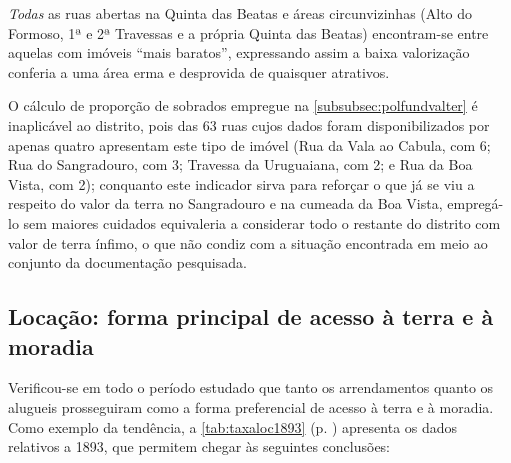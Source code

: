 \textit{Todas} as ruas abertas na Quinta das Beatas e áreas circunvizinhas (Alto do Formoso, 1ª e 2ª Travessas e a própria Quinta das Beatas) encontram-se entre aquelas com imóveis ``mais baratos'', expressando assim a baixa valorização conferia a uma área erma e desprovida de quaisquer atrativos.

O cálculo de proporção de sobrados empregue na \autoref{subsubsec:polfundvalter} é inaplicável ao distrito, pois das 63 ruas cujos dados foram disponibilizados por  apenas quatro apresentam este tipo de imóvel (Rua da Vala ao Cabula, com 6; Rua do Sangradouro, com 3; Travessa da Uruguaiana, com 2; e Rua da Boa Vista, com 2); conquanto este indicador sirva para reforçar o que já se viu a respeito do valor da terra no Sangradouro e na cumeada da Boa Vista, empregá-lo sem maiores cuidados equivaleria a considerar todo o restante do distrito com valor de terra ínfimo, o que não condiz com a situação encontrada em meio ao conjunto da documentação pesquisada. 

\subsection{Locação: forma principal de acesso à terra e à moradia}\label{subsec:locatermor}

Verificou-se em todo o período estudado que tanto os arrendamentos quanto os alugueis prosseguiram como a forma preferencial de acesso à terra e à moradia. Como exemplo da tendência, a \autoref{tab:taxaloc1893} (p. \pageref{tab:taxaloc1893}) apresenta os dados relativos a 1893, que permitem chegar às seguintes conclusões:

\afterpage{

}


